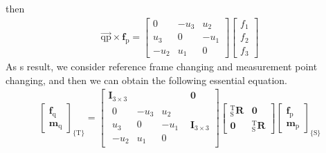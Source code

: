 then
\begin{equation}
\begin{split}
\overrightarrow{\mathrm{q}\mathrm{p}}\times \boldsymbol{f}_\mathrm{p}
=
\begin{bmatrix}
0		&-u_3		&u_2		\\
u_3		&0			&-u_1		\\
-u_2	&u_1		&0		
\end{bmatrix}
\begin{bmatrix}
f_1\\
f_2\\
f_3
\end{bmatrix}
\end{split}
\end{equation}
As s result, we consider reference frame changing and measurement point changing, and then we can obtain the following essential equation.
\begin{equation}
\begin{split}
\begin{bmatrix}
\boldsymbol{f}_\mathrm{q}\\ 
\boldsymbol{m}_\mathrm{q}
\end{bmatrix}
_{\{ \mathrm{T}\}}
=
\begin{bmatrix}
\mathbf{I}_{3 \times 3} & \boldsymbol{0}\\ 
\begin{matrix}
0		&-u_3		&u_2		\\
u_3		&0			&-u_1		\\
-u_2	&u_1		&0		
\end{matrix} & \mathbf{I}_{3 \times 3}
\end{bmatrix}
\begin{bmatrix}
_\mathrm{S}^\mathrm{T}\mathbf{R} & \boldsymbol{0}\\ 
\boldsymbol{0} & _\mathrm{S}^\mathrm{T}\mathbf{R}
\end{bmatrix}
\begin{bmatrix}
\boldsymbol{f}_\mathrm{p}\\ 
\boldsymbol{m}_\mathrm{p}
\end{bmatrix}
_{\{ \mathrm{S}\}}
\end{split}
\end{equation}
